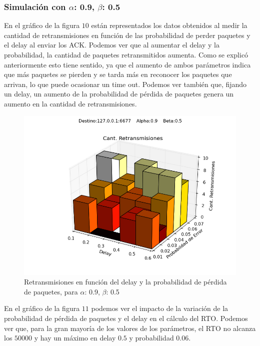 \subsubsection{Simulación con $\alpha$: 0.9, $\beta$: 0.5}

En el gráfico de la figura $10$ están representados los datos obtenidos al medir la cantidad de retransmisiones en función de las probabilidad de perder paquetes y el delay al enviar los ACK. Podemos ver que al aumentar el delay y la probabilidad, la cantidad de paquetes retransmitidos aumenta. Como se explicó anteriormente esto tiene sentido, ya que el aumento de ambos parámetros indica que más paquetes se pierden y se tarda más en reconocer los paquetes que arrivan, lo que puede ocasionar un time out. Podemos ver también que, fijando un delay, un aumento de la probabilidad de pérdida de paquetes genera un aumento en la cantidad de retransmisiones.

\begin{figure}[H]
  \centering	
	\includegraphics[scale=0.5]{../analisis/graficos_tablas/graficos_en_funcion_de_delay_probaerror/0.9-0.5/retransmisiones.png}
  \caption{Retransmisiones en funci\'on del delay y la probabilidad de pérdida de paquetes, para $\alpha$: 0.9, $\beta$: 0.5}
	\label{fig:histo-src-sitiotrabajo}
\end{figure}

En el gráfico de la figura $11$ podemos ver el impacto de la variación de la probabilidad de pérdida de paquetes y el delay en el cálculo del RTO. Podemos ver que, para la gran mayoría de los valores de los parámetros, el RTO no alcanza los $50000$ y hay un máximo en delay $0.5$ y probabilidad $0.06$. 


